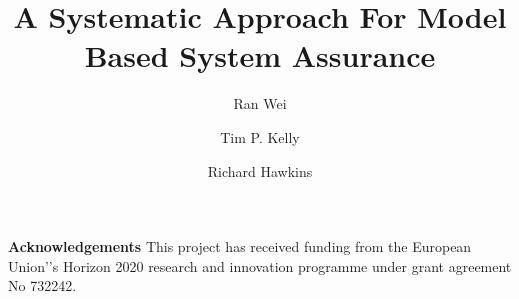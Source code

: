 \documentclass[runningheads,a4paper]{llncs}
\begin{document}
 
\title{\textbf{A Systematic Approach For Model Based System Assurance}}
\author{Ran Wei \and Tim P. Kelly \and Richard Hawkins
}

\maketitle















\noindent\textbf{Acknowledgements}
This project has received funding from the European Union'’s Horizon 2020 research and innovation programme under grant agreement No 732242. 

 
  
\end{document}
